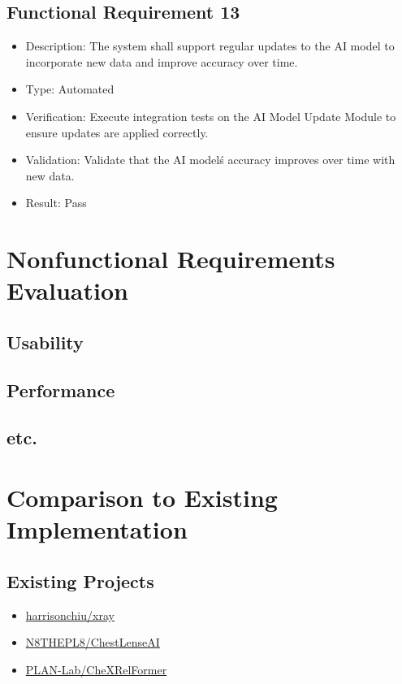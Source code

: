 \documentclass[12pt, titlepage]{article}
\begin{document}
\subsection{Functional Requirement 13}
\begin{itemize}  
  \item Description: The system shall support regular updates to the AI model to incorporate new data and improve accuracy over time.
  \item Type: Automated
  \item Verification: Execute integration tests on the AI Model Update Module to ensure updates are applied correctly.
  \item Validation: Validate that the AI model\'s accuracy improves over time with new data.
  \item Result: Pass
\end{itemize}

\section{Nonfunctional Requirements Evaluation}

\subsection{Usability}
		
\subsection{Performance}

\subsection{etc.}
	
\section{Comparison to Existing Implementation}	

\subsection{Existing Projects}
\begin{itemize}
    \item \href{https://github.com/harrisonchiu/xray/tree/main}{harrisonchiu/xray}
    \item \href{https://github.com/N8THEPL8/ChestLenseAI/tree/main}{N8THEPL8/ChestLenseAI}
    \item \href{https://github.com/PLAN-Lab/CheXRelFormer/tree/main}{PLAN-Lab/CheXRelFormer}
\end{itemize}
\end{document}
